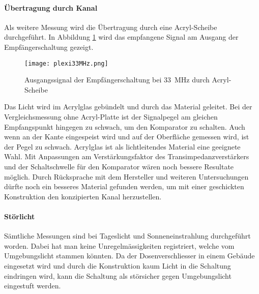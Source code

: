 \newpage
\paragraph{Übertragung durch Kanal}
Als weitere Messung wird die Übertragung durch eine Acryl-Scheibe durchgeführt. In Abbildung \ref{fig:plexi33} wird das empfangene Signal am Ausgang der Empfängerschaltung gezeigt.
\begin{figure}[h!]
	\centering
	\texttt{[image: plexi33MHz.png]}
	\caption{Ausgangssignal der Empfängerschaltung bei \SI{33}{MHz} durch Acryl-Scheibe}\label{fig:plexi33}
\end{figure}
Das Licht wird im Acrylglas gebündelt und durch das Material geleitet. Bei der Vergleichsmessung ohne Acryl-Platte ist der Signalpegel am gleichen Empfangspunkt hingegen zu schwach, um den Komparator zu schalten. Auch wenn an der Kante eingespeist wird und auf der Oberfläche gemessen wird, ist der Pegel zu schwach. Acrylglas ist als lichtleitendes Material eine geeignete Wahl. Mit Anpassungen am Verstärkungsfaktor des Transimpedanzverstärkers und der Schaltschwelle für den Komparator wären noch bessere Resultate möglich. Durch Rücksprache mit dem Hersteller und weiteren Untersuchungen dürfte noch ein besseres Material gefunden werden, um mit einer geschickten Konstruktion den konzipierten Kanal herzustellen.

\paragraph{Störlicht}
Sämtliche Messungen sind bei Tageslicht und Sonneneinstrahlung durchgeführt worden. Dabei hat man keine Unregelmässigkeiten registriert, welche vom Umgebungslicht stammen könnten. Da der Dosenverschliesser in einem Gebäude eingesetzt wird und durch die Konstruktion kaum Licht in die Schaltung eindringen wird, kann die Schaltung als störsicher gegen Umgebungslicht eingestuft werden.